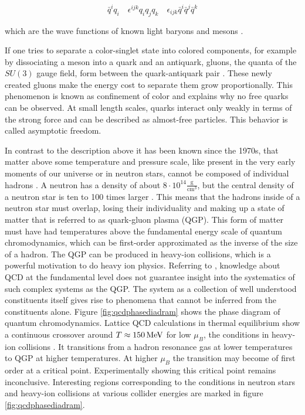 \documentclass[
  a4paper,
  12pt,
  oneside,
  parskip=half,
  listof=totoc,
  bibliography=totoc,
  DIV=12,
  numbers=noenddot,
  BA.tex
  ]{subfiles}
\begin{document}
\begin{equation}
	\bar{q}^i q_i \quad \epsilon^{ijk} q_i q_j q_k \quad \epsilon_{ijk} \bar{q}^i \bar{q}^j \bar{q}^k
\end{equation}

which are the wave functions of known light baryons and mesons \cite{peskin_introduction_2018}.

If one tries to separate a color-singlet state into colored components, for example by dissociating a meson into a quark and an antiquark, gluons, the quanta of the $SU(3)$ gauge field, form between the quark-antiquark pair \cite{peskin_introduction_2018}. These newly created gluons make the energy cost to separate them grow proportionally. This phenomenon is known as confinement of color and explains why no free quarks can be observed. At small length scales, quarks interact only weakly in terms of the strong force and can be described as almost-free particles. This behavior is called asymptotic freedom.

In contrast to the description above it has been known since the 1970s, that matter above some temperature and pressure scale, like present in the very early moments of our universe or in neutron stars, cannot be composed of individual hadrons \cite{collins_superdense_1975}. A neutron has a density of about $8 \cdot 10^{14} \frac{\text{g}}{\text{cm}^3}$, but the central density of a neutron star is ten to 100 times larger \cite{busza_heavy_2018}. This means that the hadrons inside of a neutron star must overlap, losing their individuality and making up a state of matter that is referred to as quark-gluon plasma (QGP). This form of matter must have had temperatures above the fundamental energy scale of quantum chromodynamics, which can be first-order approximated as the inverse of the size of a hadron. The QGP can be produced in heavy-ion collisions, which is a powerful motivation to do heavy ion physics. Referring to \cite{anderson_more_1972}, knowledge about QCD at the fundamental level does not guarantee insight into the systematics of such complex systems as the QGP. The system as a collection of well understood constituents itself gives rise to phenomena that cannot be inferred from the constituents alone. Figure \ref{fig:qcdphasediadram} shows the phase diagram of quantum chromodynamics. Lattice QCD calculations in thermal equilibrium show a continuous crossover around $T \approx 150 \bunit{MeV}$ for low $\mu_B$, the conditions in heavy-ion collisions \cite{busza_heavy_2018}. It transitions from a hadron resonance gas at lower temperatures to QGP at higher temperatures. At higher $\mu_B$ the transition may become of first order at a critical point. Experimentally showing this critical point remains inconclusive. Interesting regions corresponding to the conditions in neutron stars and heavy-ion collisions at various collider energies are marked in figure \ref{fig:qcdphasediadram}. 
\end{document}
